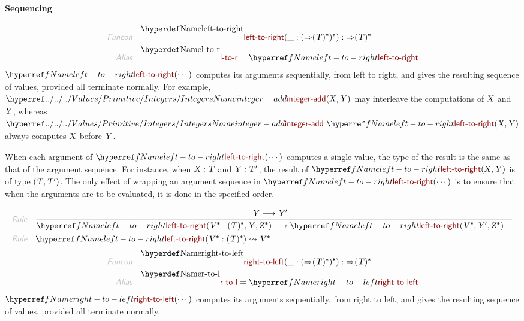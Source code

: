 \paragraph{Sequencing}\hypertarget{sequencing}{}\label{sequencing}

\begin{align*}
  \KEY{Funcon} \quad
  & \NAMEDECL{left-to-right}(
                       \_ : (   \TO (  \VAR{T} )\STAR )\STAR) 
    :  \TO (  \VAR{T} )\STAR 
\\
  \KEY{Alias} \quad
  & \NAMEDECL{l-to-r} = \NAMEREF{left-to-right}
\end{align*}
$\SHADE{\NAMEREF{left-to-right}
           (  \cdots )}$ computes its arguments sequentially, from left to right,
  and gives the resulting sequence of values, provided all terminate normally.
  For example, $\SHADE{\NAMEHYPER{../../../Values/Primitive}{Integers}{integer-add}
           (  \VAR{X}, 
                  \VAR{Y} )}$ may interleave the computations of $\SHADE{\VAR{X}}$ and
  $\SHADE{\VAR{Y}}$, whereas $\SHADE{\NAMEHYPER{../../../Values/Primitive}{Integers}{integer-add} \ 
           \NAMEREF{left-to-right}
             (  \VAR{X}, 
                    \VAR{Y} )}$ always computes $\SHADE{\VAR{X}}$ before $\SHADE{\VAR{Y}}$.

When each argument of $\SHADE{\NAMEREF{left-to-right}
           (  \cdots )}$ computes a single value, the type
  of the result is the same as that of the argument sequence. For instance,
  when $\SHADE{\VAR{X} : \VAR{T}}$ and $\SHADE{\VAR{Y} : \VAR{T}'}$, the result of $\SHADE{\NAMEREF{left-to-right}
           (  \VAR{X}, 
                  \VAR{Y} )}$ is of type $\SHADE{(  \VAR{T}, 
                \VAR{T}' )}$.
  The only effect of wrapping an argument sequence in $\SHADE{\NAMEREF{left-to-right}
           (  \cdots )}$ is to
  ensure that when the arguments are to be evaluated, it is done in the
  specified order.

\begin{align*}
  \KEY{Rule} \quad
    & \RULE{
      &  \VAR{Y} \TRANS 
          \VAR{Y}'
      }{
      &  \NAMEREF{left-to-right}
                      (  \VAR{V}\STAR : (  \VAR{T} )\STAR, 
                             \VAR{Y}, 
                             \VAR{Z}\STAR ) \TRANS 
          \NAMEREF{left-to-right}
            (  \VAR{V}\STAR, 
                   \VAR{Y}', 
                   \VAR{Z}\STAR )
      }
\\
  \KEY{Rule} \quad
    & \NAMEREF{left-to-right}
        (  \VAR{V}\STAR : (  \VAR{T} )\STAR ) \leadsto 
        \VAR{V}\STAR
\end{align*}
\begin{align*}
  \KEY{Funcon} \quad
  & \NAMEDECL{right-to-left}(
                       \_ : (   \TO (  \VAR{T} )\STAR )\STAR) 
    :  \TO (  \VAR{T} )\STAR 
\\
  \KEY{Alias} \quad
  & \NAMEDECL{r-to-l} = \NAMEREF{right-to-left}
\end{align*}
$\SHADE{\NAMEREF{right-to-left}
           (  \cdots )}$ computes its arguments sequentially, from right to left,
  and gives the resulting sequence of values, provided all terminate normally.


